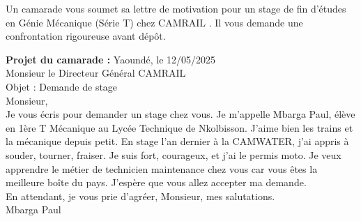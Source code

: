 \documentclass[11pt]{article}
\begin{document}
\begin{exercice}
Un camarade vous soumet sa lettre de motivation pour un stage de fin d'études en Génie Mécanique (Série T) chez \og CAMRAIL \fg{}. Il vous demande une \og confrontation \fg{} rigoureuse avant dépôt.

\textbf{Projet du camarade :}
\og Yaoundé, le 12/05/2025\\
Monsieur le Directeur Général CAMRAIL\\
Objet : Demande de stage\\
Monsieur,\\
Je vous écris pour demander un stage chez vous. Je m'appelle Mbarga Paul, élève en 1ère T Mécanique au Lycée Technique de Nkolbisson. J'aime bien les trains et la mécanique depuis petit. En stage l'an dernier à la CAMWATER, j'ai appris à souder, tourner, fraiser. Je suis fort, courageux, et j'ai le permis moto. Je veux apprendre le métier de technicien maintenance chez vous car vous êtes la meilleure boîte du pays. J'espère que vous allez accepter ma demande.\\
En attendant, je vous prie d'agréer, Monsieur, mes salutations.\\
Mbarga Paul \fg{}


\end{exercice}
\end{document}

